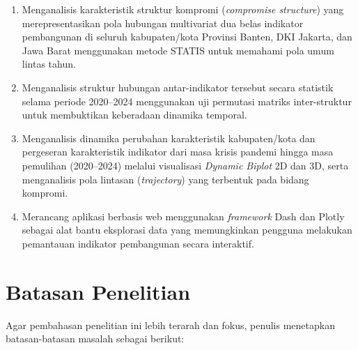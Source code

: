 \documentclass[a4paper]{article}
\theoremstyle{definition} %
\begin{document}
\begin{enumerate}
    \item Menganalisis karakteristik struktur kompromi (\textit{compromise structure}) yang merepresentasikan pola hubungan multivariat dua belas indikator pembangunan di seluruh kabupaten/kota Provinsi Banten, DKI Jakarta, dan Jawa Barat menggunakan metode STATIS untuk memahami pola umum lintas tahun.
    \item Menganalisis struktur hubungan antar-indikator tersebut secara statistik selama periode 2020--2024 menggunakan uji permutasi matriks inter-struktur untuk membuktikan keberadaan dinamika temporal.
    \item Menganalisis dinamika perubahan karakteristik kabupaten/kota dan pergeseran karakteristik indikator dari masa krisis pandemi hingga masa pemulihan (2020--2024) melalui visualisasi \textit{Dynamic Biplot} 2D dan 3D, serta menganalisis pola lintasan (\textit{trajectory}) yang terbentuk pada bidang kompromi.
    \item Merancang aplikasi berbasis web menggunakan \textit{framework} Dash dan Plotly sebagai alat bantu eksplorasi data yang memungkinkan pengguna melakukan pemantauan indikator pembangunan secara interaktif.
\end{enumerate}

\section{Batasan Penelitian}

Agar pembahasan penelitian ini lebih terarah dan fokus, penulis menetapkan batasan-batasan masalah sebagai berikut:
\end{document}
